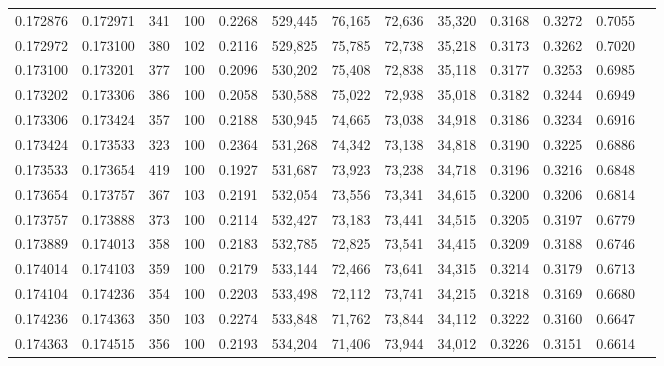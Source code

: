 \begin{tabular}{rrrrrrrrrrrrr}
0.172876 & 0.172971 &   341 & 100 &                                     0.2268 & 529,445 &  76,165 &  72,636 &  35,320 & 0.3168 & 0.3272 & 0.7055 \\
0.172972 & 0.173100 &   380 & 102 &                                     0.2116 & 529,825 &  75,785 &  72,738 &  35,218 & 0.3173 & 0.3262 & 0.7020 \\
0.173100 & 0.173201 &   377 & 100 &                                     0.2096 & 530,202 &  75,408 &  72,838 &  35,118 & 0.3177 & 0.3253 & 0.6985 \\
0.173202 & 0.173306 &   386 & 100 &                                     0.2058 & 530,588 &  75,022 &  72,938 &  35,018 & 0.3182 & 0.3244 & 0.6949 \\
0.173306 & 0.173424 &   357 & 100 &                                     0.2188 & 530,945 &  74,665 &  73,038 &  34,918 & 0.3186 & 0.3234 & 0.6916 \\
0.173424 & 0.173533 &   323 & 100 &                                     0.2364 & 531,268 &  74,342 &  73,138 &  34,818 & 0.3190 & 0.3225 & 0.6886 \\
0.173533 & 0.173654 &   419 & 100 &                                     0.1927 & 531,687 &  73,923 &  73,238 &  34,718 & 0.3196 & 0.3216 & 0.6848 \\
0.173654 & 0.173757 &   367 & 103 &                                     0.2191 & 532,054 &  73,556 &  73,341 &  34,615 & 0.3200 & 0.3206 & 0.6814 \\
0.173757 & 0.173888 &   373 & 100 &                                     0.2114 & 532,427 &  73,183 &  73,441 &  34,515 & 0.3205 & 0.3197 & 0.6779 \\
0.173889 & 0.174013 &   358 & 100 &                                     0.2183 & 532,785 &  72,825 &  73,541 &  34,415 & 0.3209 & 0.3188 & 0.6746 \\
0.174014 & 0.174103 &   359 & 100 &                                     0.2179 & 533,144 &  72,466 &  73,641 &  34,315 & 0.3214 & 0.3179 & 0.6713 \\
0.174104 & 0.174236 &   354 & 100 &                                     0.2203 & 533,498 &  72,112 &  73,741 &  34,215 & 0.3218 & 0.3169 & 0.6680 \\
0.174236 & 0.174363 &   350 & 103 &                                     0.2274 & 533,848 &  71,762 &  73,844 &  34,112 & 0.3222 & 0.3160 & 0.6647 \\
0.174363 & 0.174515 &   356 & 100 &                                     0.2193 & 534,204 &  71,406 &  73,944 &  34,012 & 0.3226 & 0.3151 & 0.6614 \\

\end{tabular}

